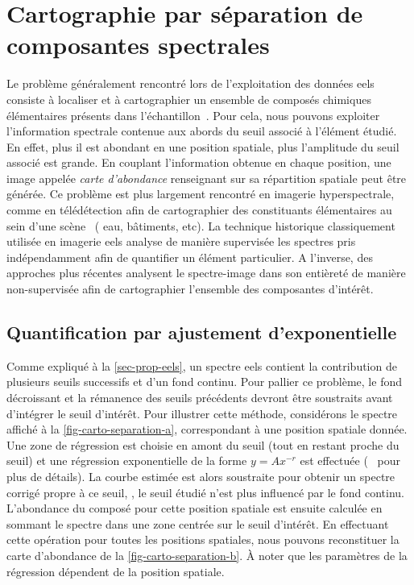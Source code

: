     

    \section{Cartographie par séparation de composantes spectrales}\label{sec-exploitation-eels}

    Le problème généralement rencontré lors de l'exploitation des données \gls{eels} consiste à localiser et à cartographier un ensemble de composés chimiques élémentaires présents dans l'échantillon~\cite{colliex2012stem, pennycook2011seeing, dobigeon2012spectral}.
    Pour cela, nous pouvons exploiter l'information spectrale contenue aux abords du seuil associé à l'élément étudié. En effet, plus il est abondant en une position spatiale, plus l'amplitude du seuil associé est grande. En couplant l'information obtenue en chaque position, une image appelée \emph{carte d'abondance} renseignant sur sa répartition spatiale peut être générée. 
    Ce problème est plus largement rencontré en imagerie hyperspectrale, comme en télédétection afin de cartographier des constituants élémentaires au sein d'une scène~\cite{lelong1998hyperspectral} (\eg{} eau, bâtiments, etc).
    La technique historique classiquement utilisée en imagerie \gls{eels} analyse de manière supervisée les spectres pris indépendamment afin de quantifier un élément particulier.
    A l'inverse, des approches plus récentes analysent le spectre-image dans son entièreté de manière non-supervisée afin de cartographier l'ensemble des composantes d'intérêt. 


    \subsection{Quantification par ajustement d'exponentielle}
    
    Comme expliqué à la \cref{sec-prop-eels}, un spectre \gls{eels} contient la contribution de plusieurs seuils successifs et d'un fond continu. Pour pallier ce problème, le fond décroissant et la rémanence des seuils précédents devront être soustraits avant d'intégrer le seuil d'intérêt. Pour illustrer cette méthode, considérons le spectre affiché à la \cref{fig-carto-separation-a}, correspondant à une position spatiale donnée. Une zone de régression est choisie en amont du seuil (tout en restant proche du seuil) et une régression exponentielle de la forme $y=Ax^{-r}$ est effectuée (\cf{}~\cite[Section~4.4]{egerton2011electron} pour plus de détails). La courbe estimée est alors soustraite pour obtenir un spectre corrigé propre à ce seuil, \ie{}, le seuil étudié n'est plus influencé par le fond continu. L'abondance du composé pour cette position spatiale est ensuite calculée en sommant le spectre dans une zone centrée sur le seuil d'intérêt. En effectuant cette opération pour toutes les positions spatiales, nous pouvons reconstituer la carte d'abondance de la \cref{fig-carto-separation-b}. \`A noter que les paramètres de la régression dépendent de la position spatiale.

